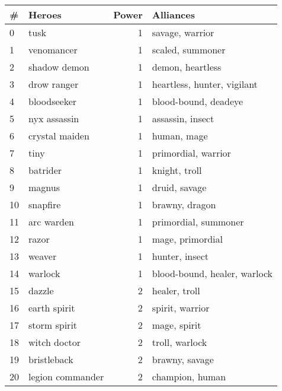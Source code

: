 \documentclass{article}
\begin{document}
\begin{table}
\center
\resizebox{!}{9cm} {
\begin{tabular}{llrl}
{\#} &                 Heroes &  Power &                       Alliances \\
\midrule
0  &                 tusk &      1 &               savage, warrior  \\
1  &           venomancer &      1 &               scaled, summoner \\
2  &         shadow demon &      1 &               demon, heartless \\
3  &          drow ranger &      1 &    heartless, hunter, vigilant \\
4  &          bloodseeker &      1 &           blood-bound, deadeye \\
5  &         nyx assassin &      1 &               assassin, insect \\
6  &       crystal maiden &      1 &                    human, mage \\
7  &                 tiny &      1 &           primordial, warrior  \\
8  &             batrider &      1 &                  knight, troll \\
9  &               magnus &      1 &                  druid, savage \\
10 &             snapfire &      1 &                 brawny, dragon \\
11 &           arc warden &      1 &           primordial, summoner \\
12 &                razor &      1 &               mage, primordial \\
13 &               weaver &      1 &                 hunter, insect \\
14 &              warlock &      1 &  blood-bound, healer, warlock  \\
15 &               dazzle &      2 &                  healer, troll \\
16 &         earth spirit &      2 &               spirit, warrior  \\
17 &         storm spirit &      2 &                   mage, spirit \\
18 &         witch doctor &      2 &                troll, warlock  \\
19 &          bristleback &      2 &                 brawny, savage \\
20 &     legion commander &      2 &                champion, human \\

\end{tabular}}
\end{table}
\end{document}

